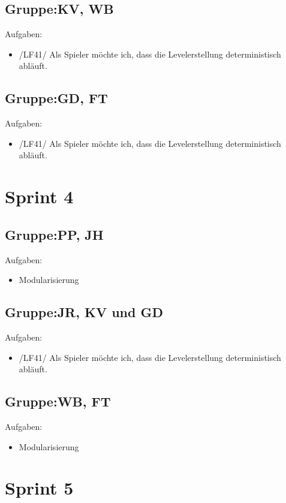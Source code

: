 \documentclass[11pt,a4paper]{article}
\begin{document}
\subsection*{Gruppe:KV, WB}
Aufgaben:
\begin{itemize}
\item /LF41/ Als Spieler möchte ich, dass die Levelerstellung deterministisch abläuft.

\end{itemize}
\subsection*{Gruppe:GD, FT}
Aufgaben:
\begin{itemize}
\item /LF41/ Als Spieler möchte ich, dass die Levelerstellung deterministisch abläuft. 
\end{itemize}


\section*{Sprint 4}

\subsection*{Gruppe:PP, JH}
Aufgaben:
\begin{itemize}
\item Modularisierung
\end{itemize}

\subsection*{Gruppe:JR, KV und GD}
Aufgaben:
\begin{itemize}
\item /LF41/ Als Spieler möchte ich, dass die Levelerstellung deterministisch abläuft.
\end{itemize}

\subsection*{Gruppe:WB, FT}
Aufgaben:
\begin{itemize}
\item Modularisierung
\end{itemize}


\section*{Sprint 5}
\end{document}
